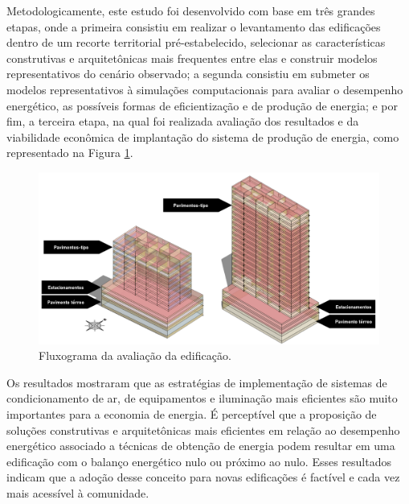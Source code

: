 \begin{onehalfspace}
    \noindent 

    \noindent Metodologicamente, este estudo foi desenvolvido com base em três 
    grandes etapas, onde a primeira consistiu em realizar o levantamento das edificações 
    dentro de um recorte territorial pré-estabelecido, selecionar as características 
    construtivas e arquitetônicas mais frequentes entre elas e construir modelos 
    representativos do cenário observado; a segunda consistiu em submeter os modelos
    representativos à simulações computacionais para avaliar o desempenho energético, 
    as possíveis formas de eficientização e de produção de energia; e por fim, a 
    terceira etapa, na qual foi realizada avaliação dos resultados e da viabilidade 
    econômica de implantação do sistema de produção de energia, como representado 
    na Figura \ref{fig:1}.\vspace*{0.3cm}
    \begin{figure}[H]
        \label{fig:1}
        \centering
        \includegraphics[width=1\textwidth]{figures/fig11_8-19-2pav.png}
        \caption{Fluxograma da avaliação da edificação.}
    \end{figure}
    
    \noindent Os resultados mostraram que as estratégias de implementação de sistemas
    de condicionamento de ar, de equipamentos e iluminação mais eficientes são muito importantes
    para a economia de energia. É perceptível que a proposição de soluções construtivas e
    arquitetônicas mais eficientes em relação ao desempenho energético associado a técnicas de
    obtenção de energia podem resultar em uma edificação com o balanço energético nulo ou
    próximo ao nulo. Esses resultados indicam que a adoção desse conceito para novas edificações é
    factível e cada vez mais acessível à comunidade.\vspace*{0.3cm}
\end{onehalfspace}
